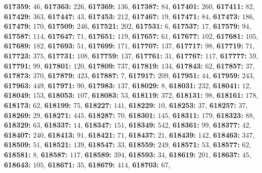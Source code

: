 \textsf{\bfseries 617359:} $46$, \textsf{\bfseries 617363:} $226$, \textsf{\bfseries 617369:} $136$, \textsf{\bfseries 617387:} $84$, \textsf{\bfseries 617401:} $260$, \textsf{\bfseries 617411:} $82$, \textsf{\bfseries 617429:} $363$, \textsf{\bfseries 617447:} $43$, \textsf{\bfseries 617453:} $212$, \textsf{\bfseries 617467:} $19$, \textsf{\bfseries 617471:} $84$, \textsf{\bfseries 617473:} $186$, \textsf{\bfseries 617479:} $170$, \textsf{\bfseries 617509:} $246$, \textsf{\bfseries 617521:} $202$, \textsf{\bfseries 617531:} $6$, \textsf{\bfseries 617537:} $17$, \textsf{\bfseries 617579:} $94$, \textsf{\bfseries 617587:} $114$, \textsf{\bfseries 617647:} $71$, \textsf{\bfseries 617651:} $119$, \textsf{\bfseries 617657:} $61$, \textsf{\bfseries 617677:} $102$, \textsf{\bfseries 617681:} $105$, \textsf{\bfseries 617689:} $182$, \textsf{\bfseries 617693:} $51$, \textsf{\bfseries 617699:} $171$, \textsf{\bfseries 617707:} $137$, \textsf{\bfseries 617717:} $98$, \textsf{\bfseries 617719:} $71$, \textsf{\bfseries 617723:} $375$, \textsf{\bfseries 617731:} $108$, \textsf{\bfseries 617759:} $137$, \textsf{\bfseries 617761:} $31$, \textsf{\bfseries 617767:} $117$, \textsf{\bfseries 617777:} $59$, \textsf{\bfseries 617791:} $99$, \textsf{\bfseries 617801:} $120$, \textsf{\bfseries 617809:} $737$, \textsf{\bfseries 617819:} $134$, \textsf{\bfseries 617843:} $62$, \textsf{\bfseries 617857:} $37$, \textsf{\bfseries 617873:} $370$, \textsf{\bfseries 617879:} $423$, \textsf{\bfseries 617887:} $7$, \textsf{\bfseries 617917:} $209$, \textsf{\bfseries 617951:} $44$, \textsf{\bfseries 617959:} $243$, \textsf{\bfseries 617963:} $449$, \textsf{\bfseries 617971:} $90$, \textsf{\bfseries 617983:} $137$, \textsf{\bfseries 618029:} $8$, \textsf{\bfseries 618031:} $232$, \textsf{\bfseries 618041:} $12$, \textsf{\bfseries 618049:} $153$, \textsf{\bfseries 618053:} $107$, \textsf{\bfseries 618083:} $53$, \textsf{\bfseries 618119:} $372$, \textsf{\bfseries 618131:} $98$, \textsf{\bfseries 618161:} $178$, \textsf{\bfseries 618173:} $62$, \textsf{\bfseries 618199:} $75$, \textsf{\bfseries 618227:} $141$, \textsf{\bfseries 618229:} $10$, \textsf{\bfseries 618253:} $37$, \textsf{\bfseries 618257:} $37$, \textsf{\bfseries 618269:} $29$, \textsf{\bfseries 618271:} $445$, \textsf{\bfseries 618287:} $70$, \textsf{\bfseries 618301:} $145$, \textsf{\bfseries 618311:} $179$, \textsf{\bfseries 618323:} $88$, \textsf{\bfseries 618329:} $63$, \textsf{\bfseries 618337:} $14$, \textsf{\bfseries 618347:} $151$, \textsf{\bfseries 618349:} $542$, \textsf{\bfseries 618361:} $99$, \textsf{\bfseries 618377:} $42$, \textsf{\bfseries 618407:} $240$, \textsf{\bfseries 618413:} $91$, \textsf{\bfseries 618421:} $71$, \textsf{\bfseries 618437:} $21$, \textsf{\bfseries 618439:} $142$, \textsf{\bfseries 618463:} $347$, \textsf{\bfseries 618509:} $51$, \textsf{\bfseries 618521:} $139$, \textsf{\bfseries 618547:} $33$, \textsf{\bfseries 618559:} $249$, \textsf{\bfseries 618571:} $53$, \textsf{\bfseries 618577:} $62$, \textsf{\bfseries 618581:} $8$, \textsf{\bfseries 618587:} $117$, \textsf{\bfseries 618589:} $394$, \textsf{\bfseries 618593:} $34$, \textsf{\bfseries 618619:} $201$, \textsf{\bfseries 618637:} $45$, \textsf{\bfseries 618643:} $105$, \textsf{\bfseries 618671:} $35$, \textsf{\bfseries 618679:} $414$, \textsf{\bfseries 618703:} $67$, 
